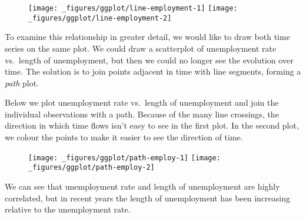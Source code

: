 \begin{figure}[H]
  \texttt{[image: \_figures/ggplot/line-employment-1]}%
  \texttt{[image: \_figures/ggplot/line-employment-2]}
\end{figure}

To examine this relationship in greater detail, we would like to draw
both time series on the same plot. We could draw a scatterplot of
unemployment rate vs.~length of unemployment, but then we could no
longer see the evolution over time. The solution is to join points
adjacent in time with line segments, forming a \emph{path} plot.

Below we plot unemployment rate vs.~length of unemployment and join the
individual observations with a path. Because of the many line crossings,
the direction in which time flows isn't easy to see in the first plot.
In the second plot, we colour the points to make it easier to see the
direction of time.

\begin{Shaded}
\begin{Highlighting}[]
\StringTok{ }\StringTok{ }
\StringTok{  }\NormalTok{() +}
\StringTok{  }\NormalTok{()}

\StringTok{ }\StringTok{ }
\StringTok{ }\StringTok{ }
\StringTok{  }\NormalTok{(} \NormalTok{) +}
\StringTok{  }\NormalTok{(}\NormalTok{(} 
\end{Highlighting}
\end{Shaded}

\begin{figure}[H]
  \texttt{[image: \_figures/ggplot/path-employ-1]}%
  \texttt{[image: \_figures/ggplot/path-employ-2]}
\end{figure}

We can see that unemployment rate and length of unemployment are highly
correlated, but in recent years the length of unemployment has been
increasing relative to the unemployment rate.

